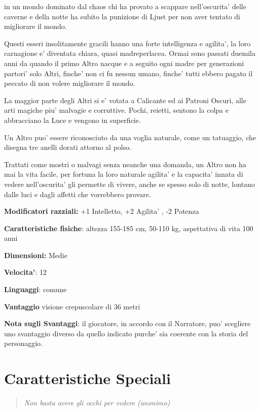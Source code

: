 \documentclass[a4paper,11pt,twoside,openany]{book}
\begin{document}
in un mondo dominato dal chaos chi ha provato a scappare nell'oscurita' delle caverne e della notte ha subito la punizione di Ljust per non aver tentato di migliorare il mondo.

Questi esseri insolitamente gracili hanno una forte intelligenza e agilita', la loro carnagione e' diventata chiara, quasi madreperlacea. Ormai sono passati duemila anni da quando il primo Altro nacque e a seguito ogni madre per generazioni partori' solo Altri, finche' non ci fu nessun umano, finche' tutti ebbero pagato il peccato di non volere migliorare il mondo.

La maggior parte degli Altri si e' votata a Calicante ed ai Patroni Oscuri, alle arti magiche piu' malvagie e corruttive. Pochi, reietti, sentono la colpa e abbracciano la Luce e vengono in superficie.

Un Altro puo' essere riconosciuto da una voglia naturale, come un tatuaggio, che disegna tre anelli dorati attorno al polso.

Trattati come mostri o malvagi senza neanche una domanda, un Altro non ha mai la vita facile, per fortuna la loro naturale agilita' e la capacita' innata di vedere nell'oscurita' gli permette di vivere, anche se spesso solo di notte, lontano dalle luci e dagli affetti che vorrebbero provare.

\textbf{Modificatori razziali:} +1 Intelletto, +2 Agilita' , -2 Potenza

\textbf{Caratteristiche fisiche}: altezza 155-185 cm, 50-110 kg, aspettativa
di vita 100 anni

\textbf{Dimensioni:} Medie

\textbf{Velocita'}: 12

\textbf{Linguaggi}: comune

\textbf{Vantaggio} visione crepuscolare di 36 metri

\bigskip

\textbf{Nota sugli Svantaggi}: il giocatore, in accordo con il Narratore, puo' scegliere uno svantaggio diverso da quello indicato purche' sia coerente con la storia del personaggio.


\pagebreak

\section{Caratteristiche Speciali}

\label{caratteristiche-speciali}
\begin{quote}\textit{Non basta avere gli occhi per vedere (anonimo)
}\end{quote}
\end{document}
